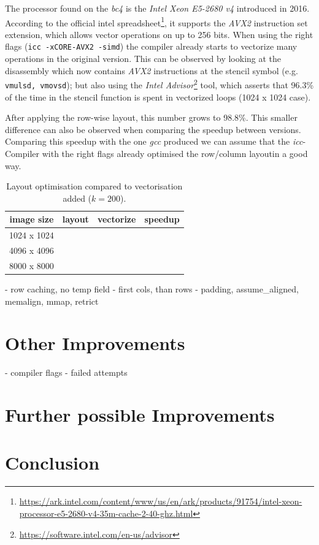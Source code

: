 \documentclass[letterpaper,twocolumn,10pt]{article}
\begin{document}
The processor found on the \textit{bc4} is the \textit{Intel Xeon E5-2680 v4} introduced in 2016.
According to the official intel spreadsheet\footnote{\url{https://ark.intel.com/content/www/us/en/ark/products/91754/intel-xeon-processor-e5-2680-v4-35m-cache-2-40-ghz.html}},
it supports the \textit{AVX2} instruction set extension, which allows vector operations on up to 256 bits.
When using the right flags (\texttt{icc -xCORE-AVX2 -simd}) the compiler already starts to vectorize many operations in the original version.
This can be observed by looking at the disassembly which now contains \textit{AVX2} instructions
at the stencil symbol (e.g. \texttt{vmulsd, vmovsd}); but also using the \textit{Intel Advisor}\footnote{\url{https://software.intel.com/en-us/advisor}} tool,
which asserts that 96.3\% of the time in the stencil function is spent in vectorized loops (1024 x 1024 case).

After applying the row-wise layout, this number grows to 98.8\%. This smaller difference
can also be observed when comparing the speedup between versions. Comparing this speedup with the one \textit{gcc} produced we can assume
that the \textit{icc}-Compiler with the right flags already optimised the row/column layoutin a good way.

\begin{table}[ht]
	\caption{Layout optimisation compared to vectorisation added ($k=200$).}
	\begin{tabular}{c c c c}
  		 image size  & layout  & vectorize    & speedup  \\
		 \hline
		 1024 x 1024 &  &  &     \\
		 4096 x 4096 &  &  &     \\
		 8000 x 8000 &  &  &     \\
	\end{tabular}
	\label{tab:flags}
\end{table}


- row caching, no temp field
- first cols, than rows
- padding, assume\_aligned, memalign, mmap, retrict

\section*{Other Improvements}

- compiler flags
- failed attempts

\section*{Further possible Improvements}

\section*{Conclusion}




\end{document}
